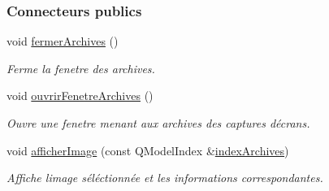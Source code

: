 \subsubsection*{Connecteurs publics}
\begin{DoxyCompactItemize}
\item 
void \hyperlink{class_archives_a0001d8b6a783f1f424965832e89a1f6f}{fermer\+Archives} ()
\begin{DoxyCompactList}\small\item\em Ferme la fenetre des archives. \end{DoxyCompactList}\item 
void \hyperlink{class_archives_a14d4f834ea05cf421161336607b4bb31}{ouvrir\+Fenetre\+Archives} ()
\begin{DoxyCompactList}\small\item\em Ouvre une fenetre menant aux archives des captures d\textquotesingle{}écrans. \end{DoxyCompactList}\item 
void \hyperlink{class_archives_a0e12a12774643d96831be4daba73976e}{afficher\+Image} (const Q\+Model\+Index \&\hyperlink{class_archives_a31cba52f3979585ee5e2b9390d21322b}{index\+Archives})
\begin{DoxyCompactList}\small\item\em Affiche l\textquotesingle{}image séléctionnée et les informations correspondantes. \end{DoxyCompactList}\end{DoxyCompactItemize}
